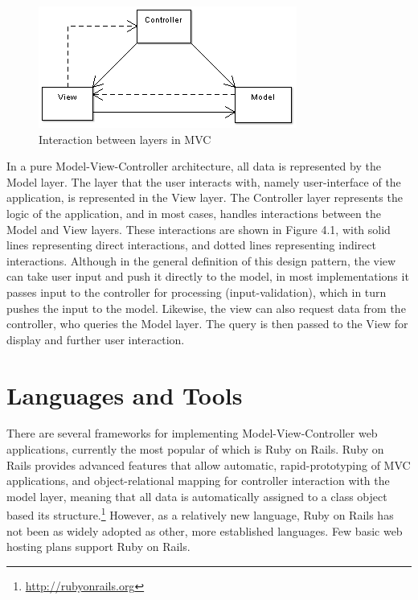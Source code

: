 \documentclass[a4paper,12pt]{report}
\begin{document}
\begin{figure}[htp]
\begin{center}
\includegraphics[scale=0.6]{./images/mvc.png}
\end{center}
\caption{Interaction between layers in MVC}
\end{figure}
In a pure Model-View-Controller architecture, all data is represented by the Model layer. The layer that the user interacts with, namely user-interface of the application, is represented in the View layer. The Controller layer represents the logic of the application, and in most cases, handles interactions between the Model and View layers. These interactions are shown in Figure 4.1, with solid lines representing direct interactions, and dotted lines representing indirect interactions. Although in the general definition of this design pattern, the view can take user input and push it directly to the model, in most implementations it passes input to the controller for processing (input-validation), which in turn pushes the input to the model. Likewise, the view can also request data from the controller, who queries the Model layer. The query is then passed to the View for display and further user interaction.

\section{Languages and Tools}
There are several frameworks for implementing Model-View-Controller web applications, currently the most popular of which is Ruby on Rails. Ruby on Rails provides advanced features that allow automatic, rapid-prototyping of MVC applications, and object-relational mapping for controller interaction with the model layer, meaning that all data is automatically assigned to a class object based its structure.\footnote{\url{http://rubyonrails.org}} However, as a relatively new language, Ruby on Rails has not been as widely adopted as other, more established languages. Few basic web hosting plans support Ruby on Rails. 
\end{document}
